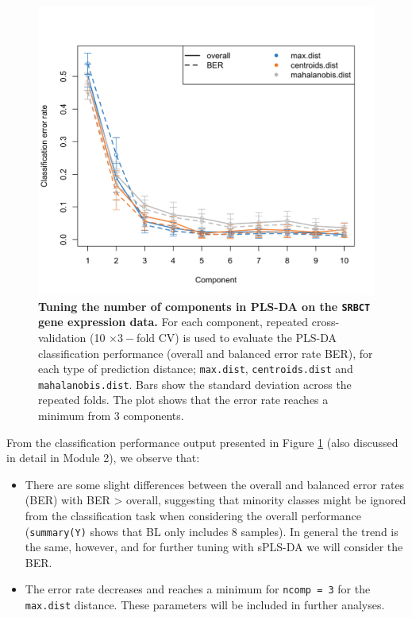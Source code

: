 \documentclass[]{book}
\begin{document}
\begin{figure}

{\centering \includegraphics[width=0.5\linewidth]{Figures/PLSDA/plsda-perf-1} 

}

\caption{\textbf{Tuning the number of components in PLS-DA on
the \texttt{SRBCT} gene expression data.} For each component, repeated
cross-validation (10 \(\times 3-\)fold CV) is used to evaluate the
PLS-DA classification performance (overall and balanced error rate BER),
for each type of prediction distance; \texttt{max.dist},
\texttt{centroids.dist} and \texttt{mahalanobis.dist}. Bars show the
standard deviation across the repeated folds. The plot shows that the
error rate reaches a minimum from 3 components.}\label{fig:plsda-perf}
\end{figure}










From the classification performance output presented in Figure
\ref{fig:plsda-perf} (also discussed in detail in Module 2), we observe
that:

\begin{itemize}
\item
  There are some slight differences between the overall and balanced
  error rates (BER) with BER \textgreater{} overall, suggesting that
  minority classes might be ignored from the classification task when
  considering the overall performance (\texttt{summary(Y)} shows that BL
  only includes 8 samples). In general the trend is the same, however,
  and for further tuning with sPLS-DA we will consider the BER.
\item
  The error rate decreases and reaches a minimum for
  \texttt{ncomp\ =\ 3} for the \texttt{max.dist} distance. These
  parameters will be included in further analyses.
\end{itemize}
\end{document}
